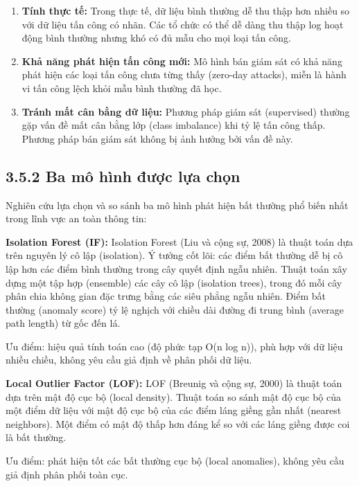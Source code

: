 \documentclass[
  a4paper]{report}
\begin{document}
\begin{enumerate}
\def\labelenumi{\arabic{enumi}.}
\item
  \textbf{Tính thực tế:} Trong thực tế, dữ liệu bình thường dễ thu thập
  hơn nhiều so với dữ liệu tấn công có nhãn. Các tổ chức có thể dễ dàng
  thu thập log hoạt động bình thường nhưng khó có đủ mẫu cho mọi loại
  tấn công.
\item
  \textbf{Khả năng phát hiện tấn công mới:} Mô hình bán giám sát có khả
  năng phát hiện các loại tấn công chưa từng thấy (zero-day attacks),
  miễn là hành vi tấn công lệch khỏi mẫu bình thường đã học.
\item
  \textbf{Tránh mất cân bằng dữ liệu:} Phương pháp giám sát (supervised)
  thường gặp vấn đề mất cân bằng lớp (class imbalance) khi tỷ lệ tấn
  công thấp. Phương pháp bán giám sát không bị ảnh hưởng bởi vấn đề này.
\end{enumerate}

\subsection{3.5.2 Ba mô hình được lựa
chọn}\label{ba-muxf4-huxecnh-ux111ux1b0ux1ee3c-lux1ef1a-chux1ecdn}

Nghiên cứu lựa chọn và so sánh ba mô hình phát hiện bất thường phổ biến
nhất trong lĩnh vực an toàn thông tin:

\textbf{Isolation Forest (IF):} Isolation Forest (Liu và cộng sự, 2008)
là thuật toán dựa trên nguyên lý cô lập (isolation). Ý tưởng cốt lõi:
các điểm bất thường dễ bị cô lập hơn các điểm bình thường trong cây
quyết định ngẫu nhiên. Thuật toán xây dựng một tập hợp (ensemble) các
cây cô lập (isolation trees), trong đó mỗi cây phân chia không gian đặc
trưng bằng các siêu phẳng ngẫu nhiên. Điểm bất thường (anomaly score) tỷ
lệ nghịch với chiều dài đường đi trung bình (average path length) từ gốc
đến lá.

Ưu điểm: hiệu quả tính toán cao (độ phức tạp O(n log n)), phù hợp với dữ
liệu nhiều chiều, không yêu cầu giả định về phân phối dữ liệu.

\textbf{Local Outlier Factor (LOF):} LOF (Breunig và cộng sự, 2000) là
thuật toán dựa trên mật độ cục bộ (local density). Thuật toán so sánh
mật độ cục bộ của một điểm dữ liệu với mật độ cục bộ của các điểm láng
giềng gần nhất (nearest neighbors). Một điểm có mật độ thấp hơn đáng kể
so với các láng giềng được coi là bất thường.

Ưu điểm: phát hiện tốt các bất thường cục bộ (local anomalies), không
yêu cầu giả định phân phối toàn cục.
\end{document}
